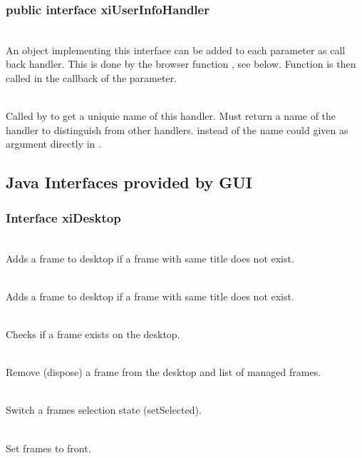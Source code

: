 \subsubsection{public interface xiUserInfoHandler}
\bcir
\item {}\\
An object implementing this interface can be added to each parameter
as call back handler. This is done by the browser function ,
see below. Function  is then called in the callback
of the parameter.
\item {}\\
Called by  to get a uniquie name of this handler.
Must return a name of the handler to distinguish from other handlers.
\ecir
{} instead of  the name could 
given as argument directly in  .
\subsection{Java Interfaces provided by GUI}
\subsubsection{Interface xiDesktop}
\bcir
\item {}\\
Adds a frame to desktop if a frame with same title does not exist.
\item {}\\
Adds a frame to desktop if a frame with same title does not exist.
\item {}\\
Checks if a frame exists on the desktop.
\item {}\\
Remove (dispose) a frame from the desktop and list of managed frames.
\item {}\\
Switch a frames selection state (setSelected).
\item {}\\
Set frames to front.
\ecir
